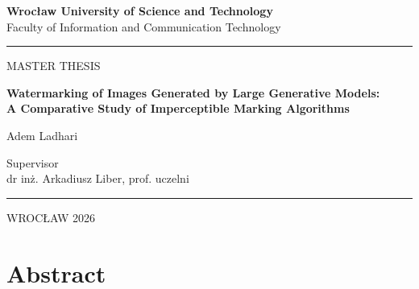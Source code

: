 ﻿\documentclass[12pt, a4paper, twoside]{report}
\numberwithin{equation}{chapter}
\begin{document}

\begin{titlepage}
    \centering
    {\fontsize{16}{18}\selectfont \textbf{Wroc\l{}aw University of Science and Technology} \\}
    {\fontsize{14}{16}\selectfont Faculty of Information and Communication Technology \\}
    \rule{\textwidth}{1pt}

    \vspace{3cm}
    {\fontsize{20}{24}\selectfont MASTER THESIS \par}

    \vspace{2cm}
    {\fontsize{16}{18}\selectfont \textbf{Watermarking of Images Generated by Large Generative Models:\\[4pt]
    A Comparative Study of Imperceptible Marking Algorithms} \par}

    \vspace{1.5cm}
    {\fontsize{14}{16}\selectfont Adem Ladhari \par}

    \vspace{2cm}
    \begin{center}
        Supervisor \\
        dr inż. Arkadiusz Liber, prof. uczelni
    \end{center}

    \vfill
  
    \rule{\textwidth}{1pt}
    WROC\L{}AW 2026
\end{titlepage}


\chapter*{Abstract}
\end{document}

